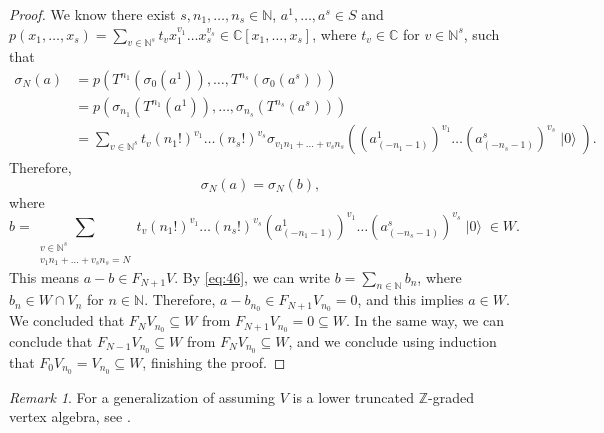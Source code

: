 \documentclass[a4paper, 12pt, reqno]{amsart}
\theoremstyle{remark}
\newtheorem{remark}[theorem]{Remark}
\DeclareMathOperator{\vac}{|0\rangle}
\begin{document}
\begin{proof}
  We know there exist $s, n_1, \dots, n_s \in \mathbb{N}$, $a^1, \dots, a^s \in S$ and $p(x_1, \dots, x_s) = \sum_{v \in \mathbb{N}^s}t_vx_1^{v_1}\dots x_s^{v_s} \in \mathbb{C}[x_1, \dots, x_s]$, where $t_v \in \mathbb{C}$ for $v \in \mathbb{N}^s$, such that
  \begin{align*}
    \sigma_N(a) &= p(T^{n_1}(\sigma_0(a^1)), \dots, T^{n_s}(\sigma_0(a^s))) \\
                &= p(\sigma_{n_1}(T^{n_1}(a^1)), \dots, \sigma_{n_s}(T^{n_s}(a^s))) \\
                &= \sum_{v \in \mathbb{N}^s}t_v(n_1!)^{v_1}\dots(n_s!)^{v_s}\sigma_{v_1n_1 + \dots + v_sn_s}((a^1_{(-n_1 - 1)})^{v_1}\dots(a^s_{(-n_s - 1)})^{v_s}\vac).
  \end{align*}
  Therefore,
  \begin{equation*}
    \sigma_N(a) = \sigma_N(b),
  \end{equation*}
  where
  \begin{equation*}
    b = \sum_{\substack{v \in \mathbb{N}^s \\ v_1n_1 + \dots + v_sn_s = N}}t_v(n_1!)^{v_1}\dots(n_s!)^{v_s}(a^1_{(-n_1 - 1)})^{v_1}\dots(a^s_{(-n_s - 1)})^{v_s}\vac \in W.
  \end{equation*}
  This means $a - b \in F_{N + 1}V$.
  By \eqref{eq:46}, we can write $b = \sum_{n \in \mathbb{N}}b_n$, where $b_n \in W \cap V_n$ for $n \in \mathbb{N}$.
  Therefore, $a - b_{n_0} \in F_{N + 1}V_{n_0} = 0$, and this implies $a \in W$.
  We concluded that $F_NV_{n_0} \subseteq W$ from $F_{N + 1}V_{n_0} = 0 \subseteq W$.
  In the same way, we can conclude that $F_{N - 1}V_{n_0} \subseteq W$ from $F_NV_{n_0} \subseteq W$, and we conclude using induction that $F_0V_{n_0} = V_{n_0} \subseteq W$, finishing the proof.
\end{proof}

\begin{remark}
  \label{rmk:45}
  For a generalization of  assuming $V$ is a lower truncated $\mathbb{Z}$-graded vertex algebra, see \cite[Theorem 4.8]{li_abelianizing_2005}.
\end{remark}
\end{document}

